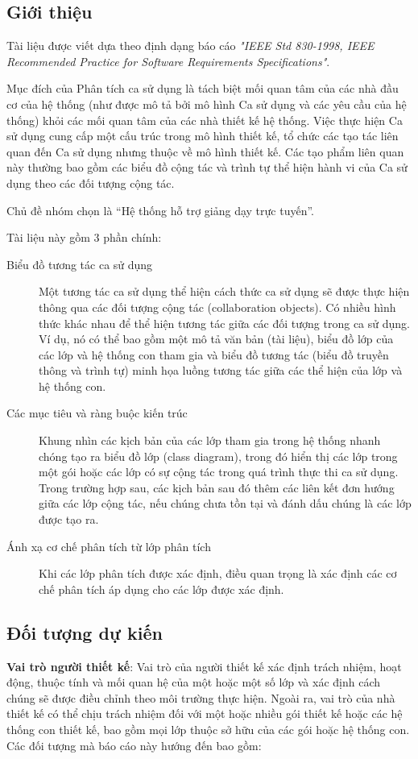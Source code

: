 \documentclass[./../main_file.tex]{subfiles}
\begin{document}
	\subsection{Giới thiệu}
	
	Tài liệu được viết dựa theo định dạng báo cáo \textit{"IEEE Std 830-1998, IEEE Recommended Practice for Software Requirements Specifications"}.
	
	
	Mục đích của Phân tích ca sử dụng là tách biệt mối quan tâm của các nhà đầu cơ của hệ thống (như được mô tả bởi mô hình Ca sử dụng và các yêu cầu của hệ thống) khỏi các mối quan tâm của các nhà thiết kế hệ thống. Việc thực hiện Ca sử dụng cung cấp một cấu trúc trong mô hình thiết kế, tổ chức các tạo tác liên quan đến Ca sử dụng nhưng thuộc về mô hình thiết kế. Các tạo phẩm liên quan này thường bao gồm các biểu đồ cộng tác và trình tự thể hiện hành vi của Ca sử dụng theo các đối tượng cộng tác.
	
	
	Chủ đề nhóm chọn là “Hệ thống hỗ trợ giảng dạy trực tuyến”.
	
	
	Tài liệu này gồm 3 phần chính: 
	\begin{description}
		\item [Biểu đồ tương tác ca sử dụng] Một tương tác ca sử dụng thể hiện cách thức ca sử dụng sẽ được thực hiện thông qua các đối tượng cộng tác (collaboration objects). Có nhiều hình thức khác nhau để thể hiện tương tác giữa các đối tượng trong ca sử dụng. Ví dụ, nó có thể bao gồm một mô tả văn bản (tài liệu), biểu đồ lớp của các lớp và hệ thống con tham gia và biểu đồ tương tác (biểu đồ truyền thông và trình tự) minh họa luồng tương tác giữa các thể hiện của lớp và hệ thống con.
		\item [Các mục tiêu và ràng buộc kiến trúc] Khung nhìn các kịch bản của các lớp tham gia trong hệ thống nhanh chóng tạo ra biểu đồ lớp (class diagram), trong đó hiển thị các lớp trong một gói hoặc các lớp có sự cộng tác trong quá trình thực thi ca sử dụng. Trong trường hợp sau, các kịch bản sau đó thêm các liên kết đơn hướng giữa các lớp cộng tác, nếu chúng chưa tồn tại và đánh dấu chúng là các lớp được tạo ra.
		\item [Ánh xạ cơ chế phân tích từ lớp phân tích] Khi các lớp phân tích được xác định, điều quan trọng là xác định các cơ chế phân tích áp dụng cho các lớp được xác định.
	\end{description}
	\subsection{Đối tượng dự kiến}
	\textbf{Vai trò người thiết kế}: Vai trò của người thiết kế xác định trách nhiệm, hoạt động, thuộc tính và mối quan hệ của một hoặc một số lớp và xác định cách chúng sẽ được điều chỉnh theo môi trường thực hiện. Ngoài ra, vai trò của nhà thiết kế có thể chịu trách nhiệm đối với một hoặc nhiều gói thiết kế hoặc các hệ thống con thiết kế, bao gồm mọi lớp thuộc sở hữu của các gói hoặc hệ thống con.
	Các đối tượng mà báo cáo này hướng đến bao gồm: 
	
\end{document}
